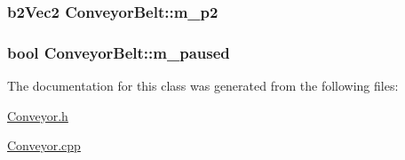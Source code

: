 \hypertarget{classConveyorBelt_a061584c0f9fe736cd06d5b81472016dd}{
\subsubsection[{m\-\_\-p2}]{\setlength{\rightskip}{0pt plus 5cm}b2\-Vec2 Conveyor\-Belt\-::m\-\_\-p2}}\label{classConveyorBelt_a061584c0f9fe736cd06d5b81472016dd}
\hypertarget{classConveyorBelt_a2325f44e6279a81a6927020e97f725a3}{
\subsubsection[{m\-\_\-paused}]{\setlength{\rightskip}{0pt plus 5cm}bool Conveyor\-Belt\-::m\-\_\-paused}}\label{classConveyorBelt_a2325f44e6279a81a6927020e97f725a3}


The documentation for this class was generated from the following files\-:\begin{DoxyCompactItemize}
\item 
\hyperlink{Conveyor_8h}{Conveyor.\-h}\item 
\hyperlink{Conveyor_8cpp}{Conveyor.\-cpp}\end{DoxyCompactItemize}
